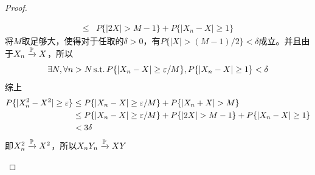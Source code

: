 \begin{proof}
\begin{enumerate}
\begin{align*}
                  \le                & P\{|2 X|>M-1\}+P\{|X_n-X| \ge 1\}
              \end{align*}
              将$M$取足够大，使得对于任取的$\delta >0$，有$P\{ |X| >(M-1) / 2 \}< \delta$成立。并且由于$X_n \xrightarrow{\P} X$，所以
              \[ \exists N, \forall n>N \st P\{|X_n-X| \ge \e / M\},P\{|X_n-X| \ge 1\} < \delta \]
              综上
              \begin{align*}
                  P\{|X_n^2-X^2| \ge \e \} & \le P\{|X_n-X| \ge \e / M\}+P\{|X_n+X|>M\}                      \\
                                           & \le P\{|X_n-X| \ge \e / M\} + P\{|2 X|>M-1\}+P\{|X_n-X| \ge 1\} \\
                                           & < 3\delta
              \end{align*}
              即$X_n^2 \xrightarrow{\P} X^2$，所以$X_n Y_n \xrightarrow{\P} XY$
    \end{enumerate}
\end{proof}

